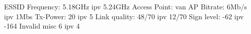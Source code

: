 ESSID
Frequency: 5.18GHz ipv 5.24GHz
Access Point: van AP
Bitrate: 6Mb/s ipv 1Mbs
Tx-Power: 20 ipv 5
Link quality: 48/70 ipv 12/70
Sign level: -62 ipv -164
Invalid misc 6 ipv 4

